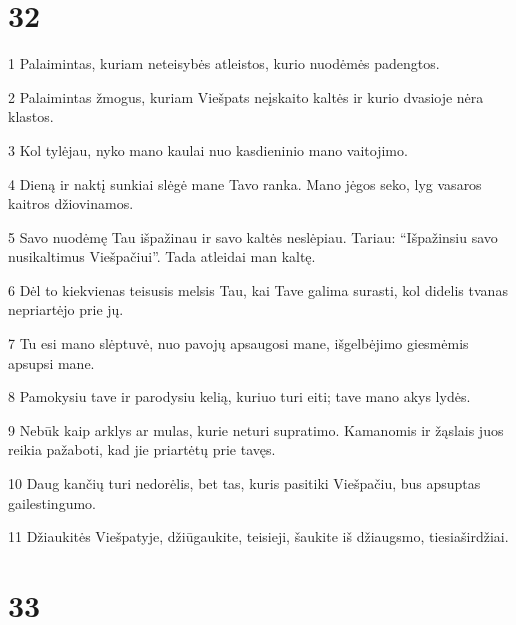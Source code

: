 \chapter{32}


\par 1 Palaimintas, kuriam neteisybės atleistos, kurio nuodėmės padengtos. 
\par 2 Palaimintas žmogus, kuriam Viešpats neįskaito kaltės ir kurio dvasioje nėra klastos. 
\par 3 Kol tylėjau, nyko mano kaulai nuo kasdieninio mano vaitojimo. 
\par 4 Dieną ir naktį sunkiai slėgė mane Tavo ranka. Mano jėgos seko, lyg vasaros kaitros džiovinamos. 
\par 5 Savo nuodėmę Tau išpažinau ir savo kaltės neslėpiau. Tariau: “Išpažinsiu savo nusikaltimus Viešpačiui”. Tada atleidai man kaltę. 
\par 6 Dėl to kiekvienas teisusis melsis Tau, kai Tave galima surasti, kol didelis tvanas nepriartėjo prie jų. 
\par 7 Tu esi mano slėptuvė, nuo pavojų apsaugosi mane, išgelbėjimo giesmėmis apsupsi mane. 
\par 8 Pamokysiu tave ir parodysiu kelią, kuriuo turi eiti; tave mano akys lydės. 
\par 9 Nebūk kaip arklys ar mulas, kurie neturi supratimo. Kamanomis ir žąslais juos reikia pažaboti, kad jie priartėtų prie tavęs. 
\par 10 Daug kančių turi nedorėlis, bet tas, kuris pasitiki Viešpačiu, bus apsuptas gailestingumo. 
\par 11 Džiaukitės Viešpatyje, džiūgaukite, teisieji, šaukite iš džiaugsmo, tiesiaširdžiai.



\chapter{33}


